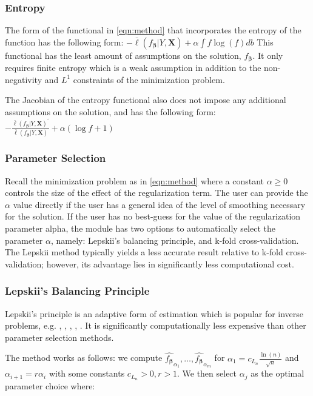 \documentclass[a4paper,12pt]{article}
\newcommand{\bbeta}{{\boldsymbol{\beta}}}
\newcommand{\bX}{\mathbf{X}}
\begin{document}
\subsubsection{Entropy}
The form of the functional in \eqref{eqn:method} that incorporates the entropy of the function has the following form: $-\bar{\ell}(f_\bbeta|Y,\bX)+\alpha \int f \log(f)db$
This functional has the least amount of assumptions on the solution, $f_\bbeta$. It only requires finite entropy which is a weak assumption in addition to the non-negativity and $L^1$ constraints of the minimization problem.

The Jacobian of the entropy functional also does not impose any additional assumptions on the solution, and has the following form: $-\frac{\bar{\ell}(f_\bbeta|Y,\bX)^{\prime}}{\bar{\ell}(f_\bbeta|Y,\bX)}+\alpha (\log f+1)$

\subsubsection{Parameter Selection}
Recall the minimization problem as in \eqref{eqn:method} where a constant $\alpha \geq 0$ controls the size of the effect of the regularization term. The user can provide the $\alpha$ value directly if the user has a general idea of the level of smoothing necessary for the solution. If the user has no best-guess for the value of the regularization parameter alpha, the module has two options to automatically select the parameter $\alpha$, namely: Lepskii's balancing principle, and k-fold cross-validation. The Lepskii method typically yields a less accurate result relative to k-fold cross-validation; however, its advantage lies in significantly less computational cost.

\subsubsection{Lepskii's Balancing Principle}

Lepskii's principle is an adaptive form of estimation which is popular for inverse problems, e.g. \cite{Tsybakov:00}, \cite{BauHoh:05}, \cite{mathe_2006}, \cite{hohage2016inverse}, \cite{Werner:18}. It is significantly computationally less expensive than other parameter selection methods.

The method works as follows: we compute $\hat{f_\bbeta}_{\alpha_{1}},\ldots,\hat{f_\bbeta}_{\alpha_{m}}$ for $\alpha_1 = c_{L_{n}} \frac{\ln(n)}{\sqrt{n}}$ and $\alpha_{i+1} = r\alpha_i$ with some constants $c_{L_{n}} >0,r>1$. We then select $\alpha_{j}$ as the optimal parameter choice where:
\end{document}
